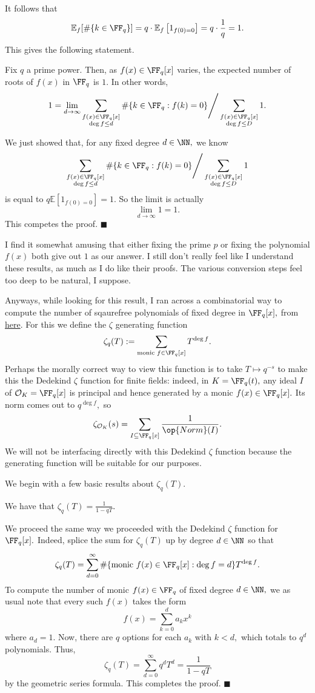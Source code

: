 It follows that
\[\mathbb E_f[\#\{k\in\FF_q\}]=q\cdot\mathbb E_f\left[1_{f(0)=0}\right]=q\cdot\frac1q=1.\]
This gives the following statement.
\begin{theorem}
    Fix $q$ a prime power. Then, as $f(x)\in\FF_q[x]$ varies, the expected number of roots of $f(x)$ in $\FF_q$ is $1.$ In other words,
    \[1=\lim_{d\to\infty}\sum_{\substack{f(x)\in\FF_q[x]\\\deg f\le d}}\#\{k\in\FF_q:f(k)=0\}\Bigg/\sum_{\substack{f(x)\in\FF_q[x]\\\deg f\le D}}1.\]
\end{theorem}
We just showed that, for any fixed degree $d\in\NN,$ we know
\[\sum_{\substack{f(x)\in\FF_q[x]\\\deg f\le d}}\#\{k\in\FF_q:f(k)=0\}\Bigg/\sum_{\substack{f(x)\in\FF_q[x]\\\deg f\le D}}1\]
is equal to $q\mathbb E\left[1_{f(0)=0}\right]=1.$ So the limit is actually
\[\lim_{d\to\infty}1=1.\]
This competes the proof. $\blacksquare$

I find it somewhat amusing that either fixing the prime $p$ or fixing the polynomial $f(x)$ both give out $1$ as our answer. I still don't really feel like I understand these results, as much as I do like their proofs. The various conversion steps feel too deep to be natural, I suppose.

Anyways, while looking for this result, I ran across a combinatorial way to compute the number of sqaurefree polynomials of fixed degree in $\FF_q[x],$ from \href{https://math.uchicago.edu/~may/REU2015/REUPapers/AlegreJuarezPajela.pdf}{here}. For this we define the $\zeta$ generating function
\[\zeta_q(T):=\sum_{\text{monic }f\in\FF_q[x]}T^{\deg f}.\]
Perhaps the morally correct way to view this function is to take $T\mapsto q^{-s}$ to make this the Dedekind $\zeta$ function for finite fields: indeed, in $K=\FF_q(t),$ any ideal $I$ of $\mathcal O_K=\FF_q[x]$ is principal and hence generated by a monic $f(x)\in\FF_q[x].$ Its norm comes out to $q^{\deg f},$ so
\[\zeta_{\mathcal O_K}(s)=\sum_{I\subseteq\FF_q[x]}\frac1{\op{Norm}(I)}.\]
We will not be interfacing directly with this Dedekind $\zeta$ function because the generating function will be suitable for our purposes.

We begin with a few basic results about $\zeta_q(T).$
\begin{lemma}
    We have that $\zeta_q(T)=\frac1{1-qT}.$
\end{lemma}
We proceed the same way we proceeded with the Dedekind $\zeta$ function for $\FF_q[x].$ Indeed, splice the sum for $\zeta_q(T)$ up by degree $d\in\NN$ so that
\[\zeta_q(T)=\sum_{d=0}^\infty\#\{\text{monic }f(x)\in\FF_q[x]:\deg f=d\}T^{\deg f}.\]
To compute the number of monic $f(x)\in\FF_q$ of fixed degree $d\in\NN,$ we as usual note that every such $f(x)$ takes the form
\[f(x)=\sum_{k=0}^da_kx^k\]
where $a_d=1.$ Now, there are $q$ options for each $a_k$ with $k<d,$ which totals to $q^d$ polynomials. Thus,
\[\zeta_q(T)=\sum_{d=0}^\infty q^dT^d=\frac1{1-qT}\]
by the geometric series formula. This completes the proof. $\blacksquare$


